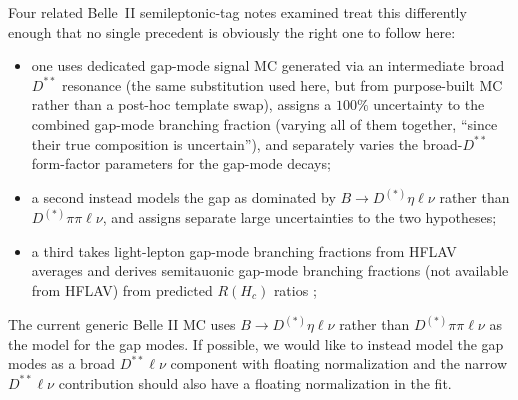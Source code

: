Four related Belle~II semileptonic-tag notes examined treat this
differently enough that no single precedent is obviously the right one to
follow here:
\begin{itemize}
  \item one uses dedicated gap-mode signal MC generated via an intermediate
        broad $D^{**}$ resonance (the same substitution used here, but from
        purpose-built MC rather than a post-hoc template swap), assigns a
        $100\%$ uncertainty to the combined gap-mode branching fraction
        (varying all of them together, ``since their true composition is
        uncertain''), and separately varies the broad-$D^{**}$ form-factor
        parameters for the gap-mode decays;
  \item a second instead models the gap as dominated by
        $B\to D^{(*)}\eta\ell\nu$ rather than $D^{(*)}\pi\pi\ell\nu$, and
        assigns separate large uncertainties to the two hypotheses;
  \item a third takes light-lepton gap-mode branching fractions from HFLAV
        averages and derives semitauonic gap-mode branching fractions (not
        available from HFLAV) from predicted $R(H_{c})$ ratios
        \cite{Bernlochner:2023eqn};
\end{itemize}

The current generic Belle II MC uses $B\to D^{(*)}\eta\ell\nu$ rather than $D^{(*)}\pi\pi\ell\nu$ as the model
for the gap modes. If possible, we would like to instead model the gap modes as a broad $D^{**}\ell \nu$ component with floating normalization
and the narrow $D^{**}\ell\nu$ contribution should also have a floating normalization in the fit.

